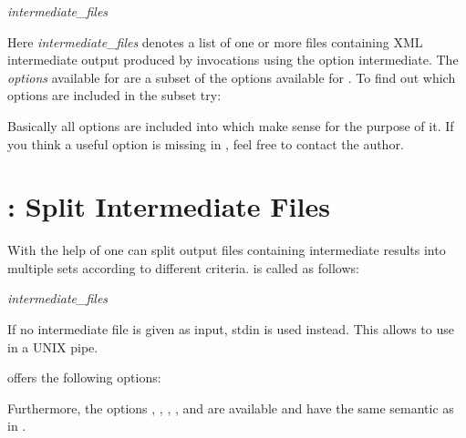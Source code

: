 \documentclass[11pt,a4paper,titlepage]{article}
\begin{document}
\medskip
{} \textit{intermediate\_files}
\medskip

Here \textit{intermediate\_files} denotes a list of one or more files containing
XML intermediate output produced by \Callgth invocations using the option \Showoption
{intermediate}. The \textit{options} available for \Callgthconsensus are a subset of the options available for \Callgth. To find out which options are included in the subset try:

\medskip
\Callgthconsensus {} 
\medskip

Basically all options are included into \Callgthconsensus which make sense
for the purpose of it.
If you think a useful option is missing in \Callgthconsensus, feel free to contact
the author.

\section{\Callgthsplit: Split Intermediate Files}
With the help of \Callgthsplit one can split \Gth output files 
containing intermediate results into multiple sets according to different 
criteria. \Callgthsplit is called as follows:

\medskip
{} \textit{intermediate\_files}
\medskip

If no intermediate file is given as input, stdin is used instead. This allows
to use \Callgthsplit in a UNIX pipe.

\Callgthsplit offers the following options:

\begin{Justshowoptions}
\end{Justshowoptions}

Furthermore, the options , , , , and  are available and have the same semantic as in \Callgth.
\end{document}
